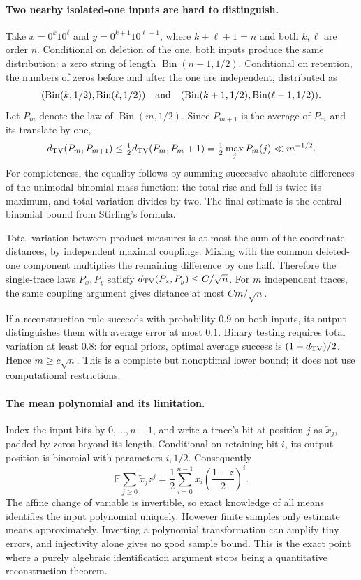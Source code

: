 \documentclass[11pt,a4paper]{article}
\newcommand{\E}{\mathbb{E}}
\begin{document}
\paragraph{Two nearby isolated-one inputs are hard to distinguish.}
Take $x=0^k1 0^\ell$ and $y=0^{k+1}1 0^{\ell-1}$, where $k+\ell+1=n$ and both $k,\ell$ are order $n$. Conditional on deletion of the one, both inputs produce the same distribution: a zero string of length $\operatorname{Bin}(n-1,1/2)$. Conditional on retention, the numbers of zeros before and after the one are independent, distributed as
\[
 (\operatorname{Bin}(k,1/2),\operatorname{Bin}(\ell,1/2))
 \quad\hbox{and}\quad
 (\operatorname{Bin}(k+1,1/2),\operatorname{Bin}(\ell-1,1/2)).
\]
Let $P_m$ denote the law of $\operatorname{Bin}(m,1/2)$. Since $P_{m+1}$ is the average of $P_m$ and its translate by one,
\[
 d_{\rm TV}(P_m,P_{m+1})
 \leq\tfrac12d_{\rm TV}(P_m,P_m+1)
 =\tfrac12\max_j P_m(j)\ll m^{-1/2}.
\]
For completeness, the equality follows by summing successive absolute differences of the unimodal binomial mass function: the total rise and fall is twice its maximum, and total variation divides by two. The final estimate is the central-binomial bound from Stirling's formula.

Total variation between product measures is at most the sum of the coordinate distances, by independent maximal couplings. Mixing with the common deleted-one component multiplies the remaining difference by one half. Therefore the single-trace laws $P_x,P_y$ satisfy $d_{\rm TV}(P_x,P_y)\leq C/\sqrt n$. For $m$ independent traces, the same coupling argument gives distance at most $Cm/\sqrt n$.

If a reconstruction rule succeeds with probability $0.9$ on both inputs, its output distinguishes them with average error at most $0.1$. Binary testing requires total variation at least $0.8$: for equal priors, optimal average success is $(1+d_{\rm TV})/2$. Hence $m\geq c\sqrt n$. This is a complete but nonoptimal lower bound; it does not use computational restrictions.

\paragraph{The mean polynomial and its limitation.}
Index the input bits by $0,\ldots,n-1$, and write a trace's bit at position $j$ as $\widetilde x_j$, padded by zeros beyond its length. Conditional on retaining bit $i$, its output position is binomial with parameters $i,1/2$. Consequently
\[
 \E\sum_{j\geq0}\widetilde x_jz^j
 =\frac12\sum_{i=0}^{n-1}x_i\left(\frac{1+z}{2}\right)^i.
\]
The affine change of variable is invertible, so exact knowledge of all means identifies the input polynomial uniquely. However finite samples only estimate means approximately. Inverting a polynomial transformation can amplify tiny errors, and injectivity alone gives no good sample bound. This is the exact point where a purely algebraic identification argument stops being a quantitative reconstruction theorem.
\end{document}
